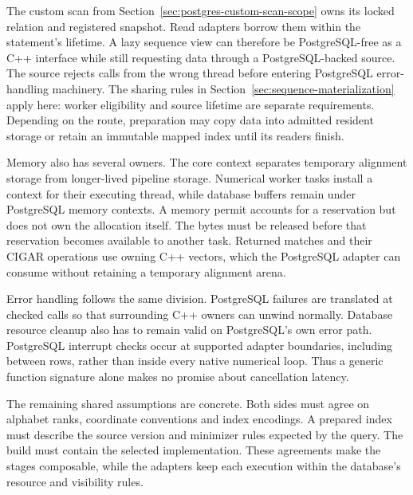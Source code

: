 The custom scan from Section~\ref{sec:postgres-custom-scan-scope} owns its
locked relation and registered snapshot. Read
adapters borrow them within the statement's lifetime. A lazy sequence view
can therefore be PostgreSQL-free as a C++ interface while still requesting
data through a PostgreSQL-backed source. The source rejects calls from the
wrong thread before entering PostgreSQL error-handling machinery. The
sharing rules in Section~\ref{sec:sequence-materialization} apply here:
worker eligibility and source lifetime are separate requirements. Depending
on the route, preparation may copy data into admitted resident storage or
retain an immutable mapped index until its readers finish.

Memory also has several owners. The core context separates temporary
alignment storage from longer-lived pipeline storage. Numerical worker tasks
install a context for their executing thread, while database buffers remain under PostgreSQL memory
contexts. A memory permit accounts for a reservation but does not own the
allocation itself. The bytes must be released before that reservation becomes
available to another task. Returned matches and their CIGAR operations use
owning C++ vectors, which the PostgreSQL adapter can consume without retaining
a temporary alignment arena.

Error handling follows the same division. PostgreSQL failures are translated
at checked calls so that surrounding C++ owners can unwind normally.
Database resource cleanup also has to remain valid on PostgreSQL's own error
path. PostgreSQL interrupt checks occur at supported adapter boundaries,
including between rows, rather than inside every native numerical loop.
Thus a generic function signature alone makes no promise about cancellation
latency.

The remaining shared assumptions are concrete. Both sides must agree on
alphabet ranks, coordinate conventions and index encodings. A prepared index
must describe the source version and minimizer rules expected by the query.
The build must contain the selected implementation. These agreements make
the stages composable, while the adapters keep each execution within the
database's resource and visibility rules.
